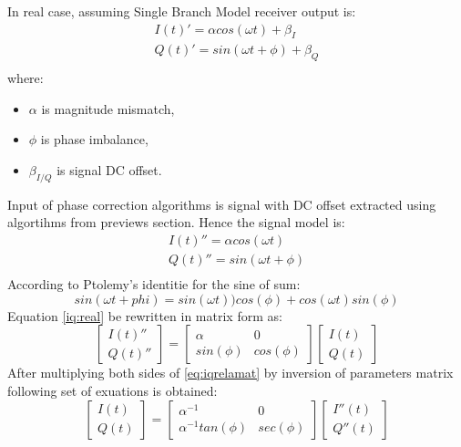 \documentclass[en,printmode]{mgr}
\begin{document}
	    In real case, assuming Single Branch Model receiver output is:
		\begin{equation}
			\renewcommand*{\arraystretch}{1.3} 
			\begin{array}{ll}
				I(t)' = \alpha cos(\omega t) + \beta_I \\
				Q(t)' = sin(\omega t + \phi) + \beta_Q \\
			\end{array}
		\end{equation}
		where:
		\begin{itemize}
			\item $\alpha$ is magnitude mismatch,
			\item $\phi$ is phase imbalance,
			\item $\beta_{I/Q}$ is signal DC offset.
		\end{itemize}
		Input of phase correction algorithms is signal with DC offset extracted using algortihms
		from previews section. Hence the signal model is:
		\begin{equation}
			\renewcommand*{\arraystretch}{1.3} 
			\begin{array}{ll}
				I(t)'' = \alpha cos(\omega t) \\
				Q(t)'' = sin(\omega t + \phi) \\
			\end{array} \label{eq:iqreal}
		\end{equation}
		According to Ptolemy’s identitie for the sine of sum:
		\[
			sin\left(\omega t + phi\right) = 
			sin\left(\omega t\right))cos\left(\phi \right) + 
			cos\left(\omega t\right) sin\left(\phi \right)
		\] 
		Equation \ref{iq:real} be rewritten in matrix form as:
		\begin{equation}
			\begin{bmatrix}
				I(t)'' \\
				Q(t)''
			\end{bmatrix}
			=
			\begin{bmatrix}
				\alpha & 0 \\
				sin(\phi) & cos(\phi)
			\end{bmatrix}
			\begin{bmatrix}
				I(t) \\
				Q(t)
			\end{bmatrix} \label{eq:iqrealmat}
		\end{equation}
		After multiplying both sides of \ref{eq:iqrelamat} by inversion of parameters matrix following set of exuations
		is obtained:
		\begin{equation}
			\begin{bmatrix}
				I(t) \\
				Q(t)
			\end{bmatrix}
			=
			\begin{bmatrix}
				\alpha^{-1} & 0 \\
				\alpha^{-1}tan(\phi) & sec(\phi)
			\end{bmatrix}
			\begin{bmatrix}
				I''(t) \\
				Q''(t)
			\end{bmatrix}
		\end{equation}
\end{document}
